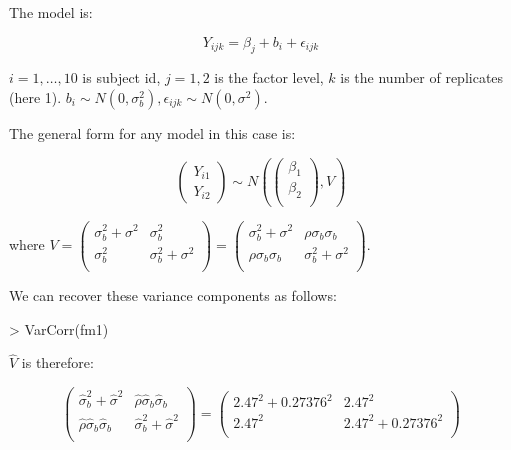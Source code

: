 \documentclass[10pt,landscape]{article}
\begin{document}
\begin{multicols}{3}
The model is:

\begin{equation}
Y_{ijk} = \beta_j + b_{i}+\epsilon_{ijk}
\end{equation}

\noindent
$i=1,\dots,10$ is subject id, $j=1,2$ is the factor level, $k$ is the number of replicates (here 1).
$b_i \sim N(0,\sigma_b^2), \epsilon_{ijk}\sim N(0,\sigma^2)$.

The general form for any model in this case is:

\begin{equation}
\begin{pmatrix}
Y_{i1}\\
Y_{i2}
\end{pmatrix}
\sim
N\left(
\begin{pmatrix}
\beta_1\\
\beta_2\\
\end{pmatrix}
,
V
\right)
\end{equation}

where $V =\begin{pmatrix}
\sigma_b^2 + \sigma^2 & \sigma_b^2\\
\sigma_b^2 & \sigma_b^2 + \sigma^2\\
\end{pmatrix}
=
\begin{pmatrix}
\sigma^2_{b} + \sigma^2  &  \rho\sigma_{b}\sigma_{b}\\
\rho\sigma_{b}\sigma_{b} & \sigma^2_{b}+\sigma^2  \\       
\end{pmatrix}$.

We can recover these variance components as follows:

\begin{Schunk}
\begin{Sinput}
> VarCorr(fm1)
\end{Sinput}
\end{Schunk}

$$ is therefore:

\begin{equation}
\begin{pmatrix}
\hat{\sigma}^2_{b} + \hat{\sigma}^2  &  \hat{\rho}\hat{\sigma}_{b}\hat{\sigma}_{b}\\
\hat{\rho}\hat{\sigma}_{b}\hat{\sigma}_{b} & \hat{\sigma}^2_{b}+\hat{\sigma}^2  \\       
\end{pmatrix}=
\begin{pmatrix}
2.47^2 + 0.27376^2 & 2.47^2\\
2.47^2 & 2.47^2 + 0.27376^2\\
\end{pmatrix}
\end{equation}


\end{multicols}
\end{document}
